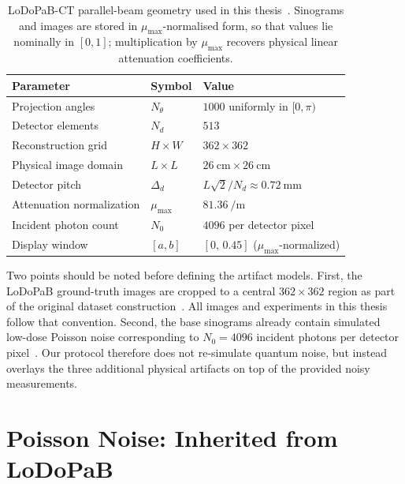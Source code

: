 \begin{table}[!htb]
    \centering
    \caption[LoDoPaB-CT parallel-beam geometry used in this thesis.]{%
        \mbox{LoDoPaB-CT} parallel-beam geometry used in this thesis~\cite{Leuschner2021}. Sinograms and images are stored in $\mu_{\max}$-normalised form, so that values lie nominally in $[0,1]$; multiplication by $\mu_{\max}$ recovers physical linear attenuation coefficients.}
    \label{tab:meth_geometry}
    \begin{tabular}{lll}
        \toprule
        Parameter                           & Symbol         & Value \\
        \midrule
        Projection angles                   & $N_\theta$     & $1000$ uniformly in $[0,\pi)$ \\
        Detector elements                   & $N_d$          & $513$ \\
        Reconstruction grid                 & $H \times W$   & $362 \times 362$ \\
        Physical image domain               & $L \times L$   & $\SI{26}{\centi\metre} \times \SI{26}{\centi\metre}$ \\
        Detector pitch                      & $\Delta_d$     & $L\sqrt{2}/N_d \approx \SI{0.72}{\milli\metre}$ \\
        Attenuation normalization           & $\mu_{\max}$   & $\SI{81.36}{\per\metre}$ \\
        Incident photon count               & $N_0$          & $4096$ per detector pixel \\
        Display window                      & $[a,b]$        & $[0,\,0.45]$ ($\mu_{\max}$-normalized) \\
        \bottomrule
    \end{tabular}
\end{table}

Two points should be noted before defining the artifact models. First, the \mbox{LoDoPaB} ground-truth images are cropped to a central \(362 \times 362\) region as part of the original dataset construction~\cite{Leuschner2021}. All images and experiments in this thesis follow that convention. Second, the base sinograms already contain simulated low-dose Poisson noise corresponding to \(N_0 = 4096\) incident photons per detector pixel~\cite{Leuschner2021}. Our protocol therefore does not re-simulate quantum noise, but instead overlays the three additional physical artifacts on top of the provided noisy measurements.

\section{Poisson Noise: Inherited from LoDoPaB}
\label{sec:meth_poisson}

